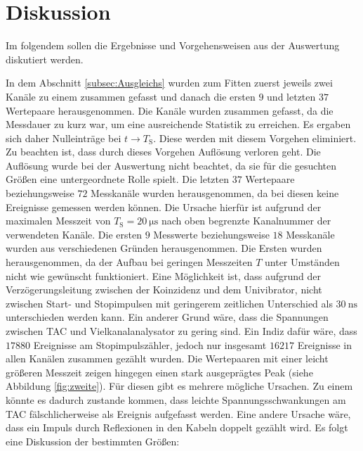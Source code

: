 
\section{Diskussion}
\label{sec:Diskussion}
Im folgendem sollen die Ergebnisse und Vorgehensweisen aus der Auswertung diskutiert werden.

In dem Abschnitt \ref{subsec:Ausgleichs} wurden zum Fitten zuerst jeweils zwei Kanäle zu einem zusammen gefasst und danach die ersten $9$ und letzten $37$ Wertepaare herausgenommen.
Die Kanäle wurden zusammen gefasst, da die Messdauer zu kurz war, um eine ausreichende Statistik zu erreichen. Es ergaben sich daher Nulleinträge bei $t \to T_\text{S}$. Diese werden mit diesem Vorgehen eliminiert. Zu beachten ist, dass durch dieses Vorgehen Auflösung verloren geht. Die Auflösung wurde bei der Auswertung nicht beachtet, da sie für die gesuchten Größen eine untergeordnete Rolle spielt. Die letzten $37$ Wertepaare beziehungsweise $72$ Messkanäle wurden herausgenommen, da bei diesen keine Ereignisse gemessen werden können. Die Ursache hierfür ist aufgrund der maximalen Messzeit von $T_\text{S}=\SI{20}{\micro\second}$ nach oben begrenzte Kanalnummer der verwendeten Kanäle. Die ersten $9$ Messwerte beziehungsweise $18$ Messkanäle wurden aus verschiedenen Gründen herausgenommen. Die Ersten wurden herausgenommen, da der Aufbau bei geringen Messzeiten $T$ unter Umständen nicht wie gewünscht funktioniert. Eine Möglichkeit ist, dass aufgrund der Verzögerungsleitung zwischen der Koinzidenz und dem Univibrator, nicht zwischen Start- und Stopimpulsen mit geringerem zeitlichen Unterschied als $\SI{30}{\nano\second}$ unterschieden werden kann. Ein anderer Grund wäre, dass die Spannungen zwischen TAC und Vielkanalanalysator zu gering sind. Ein Indiz dafür wäre, dass  $17880$ Ereignisse am Stopimpulszähler, jedoch nur insgesamt $16217$ Ereignisse in allen Kanälen zusammen gezählt wurden. Die Wertepaaren mit einer leicht größeren Messzeit zeigen hingegen einen stark ausgeprägtes Peak (siehe Abbildung \ref{fig:zweite}). Für diesen gibt es mehrere mögliche Ursachen. Zu einem könnte es dadurch zustande kommen, dass leichte Spannungsschwankungen am TAC fälschlicherweise als Ereignis aufgefasst werden. Eine andere Ursache wäre, dass ein Impuls durch Reflexionen in den Kabeln doppelt gezählt wird.
Es folgt eine Diskussion der bestimmten Größen:

